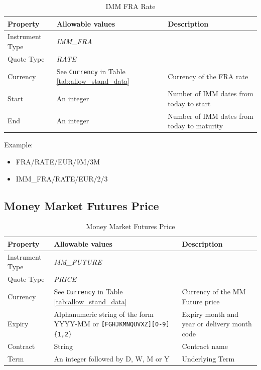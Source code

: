 \begin{table}[H]
\centering
  \begin{tabular}{|p{3.5cm}|p{3.5cm}|p{6.5cm}|}
  \hline
    {\bf Property} & {\bf Allowable values} & {\bf Description} \\ \hline
    Instrument Type & \emph{IMM\_FRA} & \\ \hline
    Quote Type & \emph{RATE} & \\ \hline
    Currency & See \lstinline!Currency! in Table \ref{tab:allow_stand_data} & Currency of the FRA rate\\ \hline
    Start & An integer & Number of IMM dates from today to start  \\ \hline
    End & An integer & Number of IMM dates from today to maturity\\ \hline
  \end{tabular}
  \caption{IMM FRA Rate}
  \label{tab:imm_fra_quote}
\end{table}

\medskip
Example:
\begin{itemize}
\item {FRA/RATE/EUR/9M/3M}
\item {IMM\_FRA/RATE/EUR/2/3}
\end{itemize}



\subsection{Money Market Futures Price}

\begin{table}[H]
\centering
  \begin{tabular}{|p{3cm}|p{4.5cm}|p{7cm}|}
  \hline
    {\bf Property} & {\bf Allowable values} & {\bf Description} \\ \hline
    Instrument Type & \emph{MM\_FUTURE} & \\ \hline
    Quote Type & \emph{PRICE} & \\ \hline
    Currency & See \lstinline!Currency! in Table \ref{tab:allow_stand_data}& Currency of the MM Future price\\ \hline
    Expiry & Alphanumeric string of the form YYYY-MM or \texttt{[FGHJKMNQUVXZ][0-9]\{1,2\}} & Expiry month and year or delivery month code\\ \hline
    Contract & String & Contract name\\ \hline
    Term & An integer followed by D, W, M or Y & Underlying Term\\ \hline
  \end{tabular}
  \caption{Money Market Futures Price}
  \label{tab:mmfp_quote}
\end{table}

